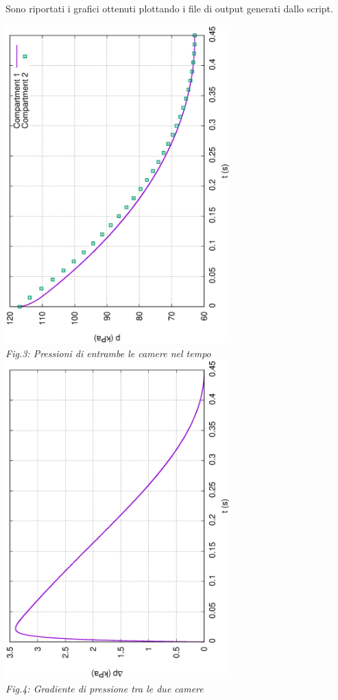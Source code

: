 \documentclass{article}
\begin{document}
        Sono riportati i grafici ottenuti plottando i file di output
        generati dallo script.
        \begin{center}
            \includegraphics[width=0.65\textwidth, angle=-90]{MUL2/p.eps}\\
            \textit{Fig.3: Pressioni di entrambe le camere nel tempo}
            \includegraphics[width=0.65\textwidth, angle=-90]{MUL2/Dp.eps}\\
            \textit{Fig.4: Gradiente di pressione tra le due camere}
        \end{center}
\end{document}
